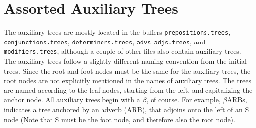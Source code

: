 \section{Assorted Auxiliary Trees} 
 
The auxiliary trees are mostly located in the buffers {\tt prepositions.trees}, {\tt conjunctions.trees}, {\tt determiners.trees}, {\tt advs-adjs.trees}, and {\tt modifiers.trees}, 
although a couple of other files also contain auxiliary trees.  The 
auxiliary trees follow a slightly different naming convention from the 
initial trees.  Since the root and foot nodes must be the same for the 
auxiliary trees, the root nodes are not explicitly mentioned in the 
names of auxiliary trees.  The trees are named according to the leaf 
nodes, starting from the left, and capitalizing the anchor node.  All 
auxiliary trees begin with a $\beta$, of course.  For example, 
$\beta$ARBs, indicates a tree anchored by an adverb (ARB), that 
adjoins onto the left of an S node (Note that S must be the foot node, 
and therefore also the root node). 
 
 
